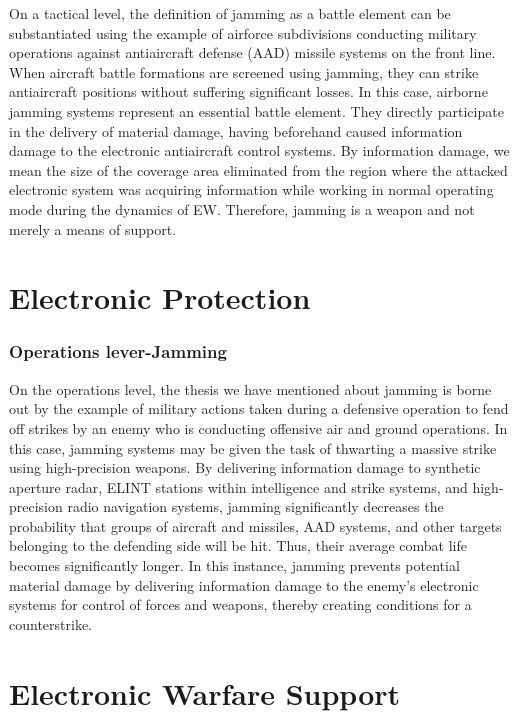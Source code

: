 \documentclass[english,purist]{ist-report}
\begin{document}
On a tactical level, the definition of jamming as a battle element can be substantiated using the example of airforce subdivisions conducting military operations against antiaircraft defense (AAD) missile systems on the front line. When aircraft battle formations are screened using jamming, they can strike antiaircraft positions without suffering significant losses. In this case, airborne jamming systems represent an essential battle element. They directly participate in the delivery of material damage, having beforehand caused information damage to the electronic antiaircraft control systems.
By information damage, we mean the size of the coverage area eliminated from the region where the attacked electronic system was acquiring information while working in normal operating mode during the dynamics of EW. Therefore, jamming is a weapon and not merely a
means of support. 




\part{Electronic Protection}

\section{Operations lever-Jamming}
On the operations level, the thesis we have mentioned about jamming
is borne out by the example of military actions taken during a defensive operation to fend off strikes by an enemy who is conducting offensive air and ground operations. In this case, jamming systems may be given the task of thwarting a massive strike using high-precision weapons. By delivering information damage to synthetic aperture radar, ELINT stations within intelligence and strike systems, and high-precision radio navigation systems, jamming significantly decreases the probability that groups of aircraft and
missiles, AAD systems, and other targets belonging to the defending side will be hit. Thus, their average combat life becomes significantly longer. In this instance, jamming prevents potential material damage by delivering information damage to the enemy's electronic systems for control of forces and weapons, thereby creating conditions for a counterstrike. 

\part{Electronic Warfare Support}

\pagebreak

\printbibliography
\end{document}
